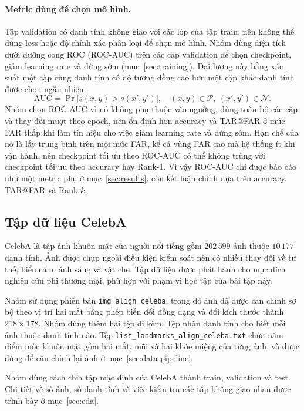 \documentclass[a4paper,12pt]{article}
\begin{document}
\paragraph{Metric dùng để chọn mô hình.} Tập validation có danh tính không giao với các lớp của tập train, nên không thể dùng loss hoặc độ chính xác phân loại để chọn mô hình. Nhóm dùng diện tích dưới đường cong ROC (ROC-AUC) trên các cặp validation để chọn checkpoint, giảm learning rate và dừng sớm (mục~\ref{sec:training}). Đại lượng này bằng xác suất một cặp cùng danh tính có độ tương đồng cao hơn một cặp khác danh tính được chọn ngẫu nhiên:
\begin{equation}
    \mathrm{AUC} = \Pr\bigl[s(x,y) > s(x',y')\bigr], \quad (x,y)\in\mathcal{P},\ (x',y')\in\mathcal{N}.
\end{equation}
Nhóm chọn ROC-AUC vì nó không phụ thuộc vào ngưỡng, dùng toàn bộ các cặp và thay đổi mượt theo epoch, nên ổn định hơn accuracy và TAR@FAR ở mức FAR thấp khi làm tín hiệu cho việc giảm learning rate và dừng sớm. Hạn chế của nó là lấy trung bình trên mọi mức FAR, kể cả vùng FAR cao mà hệ thống ít khi vận hành, nên checkpoint tối ưu theo ROC-AUC có thể không trùng với checkpoint tối ưu theo accuracy hay Rank-1. Vì vậy ROC-AUC chỉ được báo cáo như một metric phụ ở mục~\ref{sec:results}, còn kết luận chính dựa trên accuracy, TAR@FAR và Rank-$k$.

\subsection{Tập dữ liệu CelebA}
CelebA \cite{liu2015celeba} là tập ảnh khuôn mặt của người nổi tiếng gồm $202\,599$ ảnh thuộc $10\,177$ danh tính. Ảnh được chụp ngoài điều kiện kiểm soát nên có nhiều thay đổi về tư thế, biểu cảm, ánh sáng và vật che. Tập dữ liệu được phát hành cho mục đích nghiên cứu phi thương mại, phù hợp với phạm vi học tập của bài tập này.

Nhóm sử dụng phiên bản \texttt{img\_align\_celeba}, trong đó ảnh đã được căn chỉnh sơ bộ theo vị trí hai mắt bằng phép biến đổi đồng dạng và đổi kích thước thành $218 \times 178$. Nhóm dùng thêm hai tệp đi kèm. Tệp nhãn danh tính cho biết mỗi ảnh thuộc danh tính nào. Tệp \texttt{list\_landmarks\_align\_celeba.txt} chứa năm điểm mốc khuôn mặt gồm hai mắt, mũi và hai khóe miệng của từng ảnh, và được dùng để căn chỉnh lại ảnh ở mục~\ref{sec:data-pipeline}.

Nhóm dùng cách chia tập mặc định của CelebA thành train, validation và test. Chi tiết về số ảnh, số danh tính và việc kiểm tra các tập không giao nhau được trình bày ở mục~\ref{sec:eda}.
\end{document}
